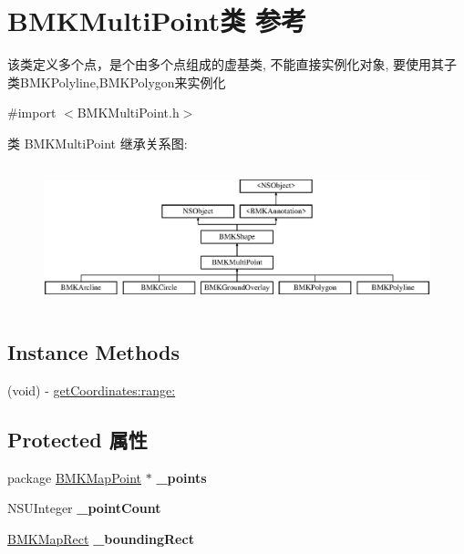 \hypertarget{interface_b_m_k_multi_point}{}\section{B\+M\+K\+Multi\+Point类 参考}
\label{interface_b_m_k_multi_point}


该类定义多个点，是个由多个点组成的虚基类, 不能直接实例化对象, 要使用其子类\+B\+M\+K\+Polyline,B\+M\+K\+Polygon来实例化  




{\ttfamily \#import $<$B\+M\+K\+Multi\+Point.\+h$>$}

类 B\+M\+K\+Multi\+Point 继承关系图\+:\begin{figure}[H]
\begin{center}
\leavevmode
\includegraphics[height=4.148148cm]{interface_b_m_k_multi_point}
\end{center}
\end{figure}
\subsection*{Instance Methods}
\begin{DoxyCompactItemize}
\item 
(void) -\/ \hyperlink{interface_b_m_k_multi_point_a5d7b000029db5c7efb2230ccb980bc29}{get\+Coordinates\+:range\+:}
\end{DoxyCompactItemize}
\subsection*{Protected 属性}
\begin{DoxyCompactItemize}
\item 
\hypertarget{interface_b_m_k_multi_point_a736d72334fd2ca7ae2108d9692d1107c}{}package \hyperlink{struct_b_m_k_map_point}{B\+M\+K\+Map\+Point} $\ast$ {\bfseries \+\_\+points}\label{interface_b_m_k_multi_point_a736d72334fd2ca7ae2108d9692d1107c}

\item 
\hypertarget{interface_b_m_k_multi_point_a8cc584110411ad5f72fc5068ae123a32}{}N\+S\+U\+Integer {\bfseries \+\_\+point\+Count}\label{interface_b_m_k_multi_point_a8cc584110411ad5f72fc5068ae123a32}

\item 
\hypertarget{interface_b_m_k_multi_point_a25b2435a2c10b3a22f6e7dc5bd064a52}{}\hyperlink{struct_b_m_k_map_rect}{B\+M\+K\+Map\+Rect} {\bfseries \+\_\+bounding\+Rect}\label{interface_b_m_k_multi_point_a25b2435a2c10b3a22f6e7dc5bd064a52}

\end{DoxyCompactItemize}
